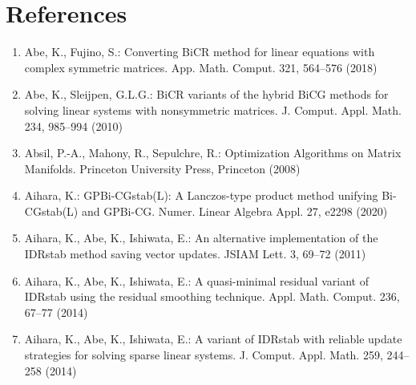 \clearpage\section*{{References}}
\makeatletter{}\label{chap:references}\makeatother
\begin{enumerate}[label=\arabic*.,ref=\arabic*,leftmargin=3em]

\item\label{bib:source-1}Abe, K., Fujino, S.: Converting BiCR method for linear equations with complex symmetric matrices. App. Math. Comput. 321, 564–576 (2018)

\item\label{bib:source-2}Abe, K., Sleijpen, G.L.G.: BiCR variants of the hybrid BiCG methods for solving linear systems with nonsymmetric matrices. J. Comput. Appl. Math. 234, 985–994 (2010)

\item\label{bib:source-3}Absil, P.-A., Mahony, R., Sepulchre, R.: Optimization Algorithms on Matrix Manifolds. Princeton University Press, Princeton (2008)

\item\label{bib:source-4}Aihara, K.: GPBi-CGstab(L): A Lanczos-type product method unifying Bi-CGstab(L) and GPBi-CG. Numer. Linear Algebra Appl. 27, e2298 (2020)

\item\label{bib:source-5}Aihara, K., Abe, K., Ishiwata, E.: An alternative implementation of the IDRstab method saving vector updates. JSIAM Lett. 3, 69–72 (2011)

\item\label{bib:source-6}Aihara, K., Abe, K., Ishiwata, E.: A quasi-minimal residual variant of IDRstab using the residual smoothing technique. Appl. Math. Comput. 236, 67–77 (2014)

\item\label{bib:source-7}Aihara, K., Abe, K., Ishiwata, E.: A variant of IDRstab with reliable update strategies for solving sparse linear systems. J. Comput. Appl. Math. 259, 244–258 (2014)


\end{enumerate}

